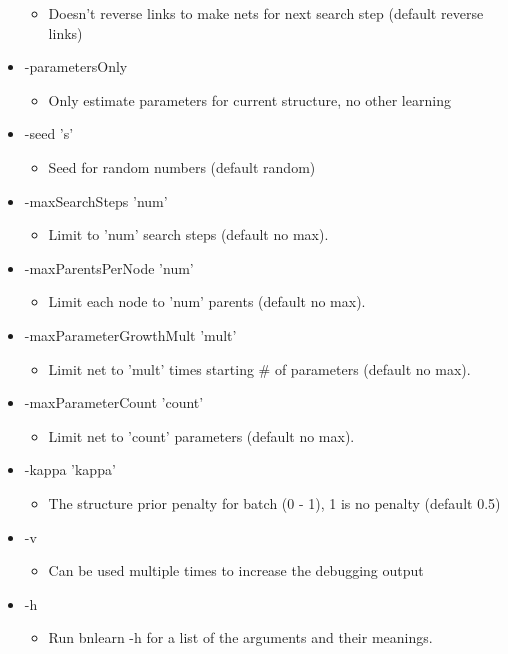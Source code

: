 \begin{itemize}
\begin{itemize}
\item Doesn't reverse links to make nets for next search step (default reverse links)\end{itemize}
\item -parameters\-Only\begin{itemize}
\item Only estimate parameters for current structure, no other learning\end{itemize}
\item -seed 's'\begin{itemize}
\item Seed for random numbers (default random)\end{itemize}
\item -max\-Search\-Steps 'num'\begin{itemize}
\item Limit to 'num' search steps (default no max).\end{itemize}
\item -max\-Parents\-Per\-Node 'num'\begin{itemize}
\item Limit each node to 'num' parents (default no max).\end{itemize}
\item -max\-Parameter\-Growth\-Mult 'mult'\begin{itemize}
\item Limit net to 'mult' times starting \# of parameters (default no max).\end{itemize}
\item -max\-Parameter\-Count 'count'\begin{itemize}
\item Limit net to 'count' parameters (default no max).\end{itemize}
\item -kappa 'kappa'\begin{itemize}
\item The structure prior penalty for batch (0 - 1), 1 is no penalty (default 0.5)\end{itemize}
\item -v\begin{itemize}
\item Can be used multiple times to increase the debugging output\end{itemize}
\item -h\begin{itemize}
\item Run bnlearn -h for a list of the arguments and their meanings.\end{itemize}
\end{itemize}


